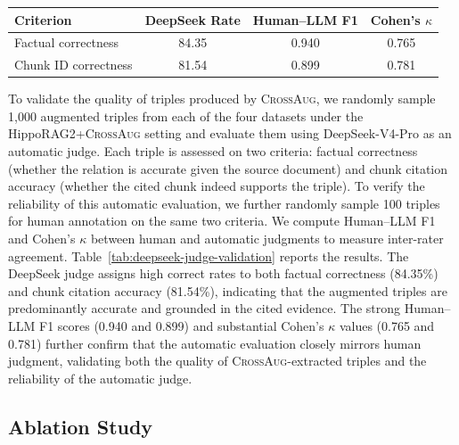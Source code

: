 \documentclass[11pt]{article}
\newcommand{\ours}{\textsc{CrossAug}\xspace}
\begin{document}
\begin{center}
{\scriptsize
\setlength{\tabcolsep}{2pt}
\begin{tabular*}{\columnwidth}{@{\extracolsep{\fill}}lccc@{}}
\toprule
\textbf{Criterion} &
\textbf{DeepSeek Rate} &
\textbf{Human--LLM F1} &
\textbf{Cohen's $\kappa$} \\
\midrule
Factual correctness & 84.35 & 0.940 & 0.765 \\
Chunk ID correctness & 81.54 & 0.899 & 0.781 \\
\bottomrule
\end{tabular*}
}
\label{tab:deepseek-judge-validation}
\end{center}

To validate the quality of triples produced by \ours, we randomly sample 1,000 augmented triples from each of the four datasets under the HippoRAG2+\ours setting and evaluate them using DeepSeek-V4-Pro as an automatic judge. Each triple is assessed on two criteria: factual correctness (whether the relation is accurate given the source document) and chunk citation accuracy (whether the cited chunk indeed supports the triple). To verify the reliability of this automatic evaluation, we further randomly sample 100 triples for human annotation on the same two criteria. We compute Human--LLM F1 and Cohen's $\kappa$ between human and automatic judgments to measure inter-rater agreement. Table~\ref{tab:deepseek-judge-validation} reports the results. The DeepSeek judge assigns high correct rates to both factual correctness (84.35\%) and chunk citation accuracy (81.54\%), indicating that the augmented triples are predominantly accurate and grounded in the cited evidence. The strong Human--LLM F1 scores (0.940 and 0.899) and substantial Cohen's $\kappa$ values (0.765 and 0.781) further confirm that the automatic evaluation closely mirrors human judgment, validating both the quality of \ours-extracted triples and the reliability of the automatic judge.

\subsection{Ablation Study}
\end{document}
